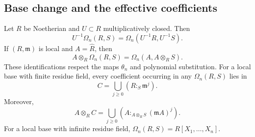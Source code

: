 \subsection{Base change and the effective coefficients}

\begin{lemma}
\label{lem:arbitrary-coefficient-basechange}
Let $R$ be Noetherian and $U\subset R$ multiplicatively closed.  Then
\[
 U^{-1}\Omega_n(R,S)
 =\Omega_n(U^{-1}R,U^{-1}S).
\]
If $(R,\mathfrak m)$ is local and $A=\widehat R$, then
\[
 A\otimes_R\Omega_n(R,S)
 =\Omega_n(A,A\otimes_R S).
\]
These identifications respect the maps $\theta_n$ and polynomial
substitution.  For a local base with finite residue field, every
coefficient occurring in any $\Omega_n(R,S)$ lies in
\[
 C=\bigcup_{j\ge0}(R:_S\mathfrak m^j).
\]
Moreover,
\[
 A\otimes_R C
 =\bigcup_{j\ge0}
   (A:_{A\otimes_R S}(\mathfrak mA)^j).
\]
For a local base with infinite residue field,
$\Omega_n(R,S)=R[X_1,\ldots,X_n]$.
\end{lemma}
